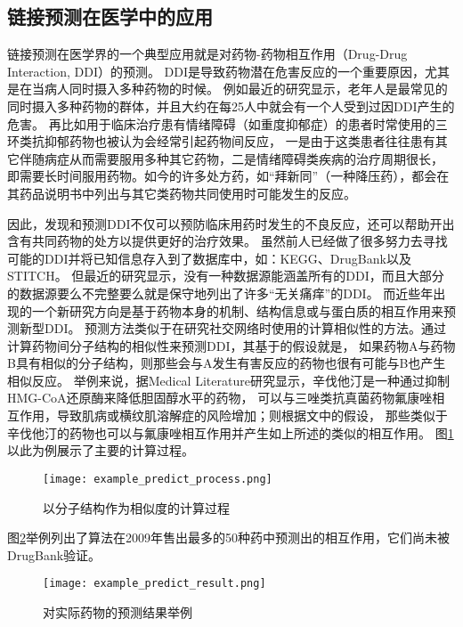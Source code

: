 \subsection{链接预测在医学中的应用}
链接预测在医学界的一个典型应用就是对药物-药物相互作用（Drug-Drug Interaction, DDI）的预测。
DDI是导致药物潜在危害反应的一个重要原因，尤其是在当病人同时摄入多种药物的时候\cite{fokoue2016predicting}。
例如最近的研究显示，老年人是最常见的同时摄入多种药物的群体，并且大约在每25人中就会有一个人受到过因DDI产生的危害\cite{huang2013systematic}\cite{juurlink2003drug}。
再比如用于临床治疗患有情绪障碍（如重度抑郁症）的患者时常使用的三环类抗抑郁药物也被认为会经常引起药物间反应，
一是由于这类患者往往患有其它伴随病症从而需要服用多种其它药物，二是情绪障碍类疾病的治疗周期很长，
即需要长时间服用药物。如今的许多处方药，如“拜新同”（一种降压药），都会在其药品说明书中列出与其它类药物共同使用时可能发生的反应。

因此，发现和预测DDI不仅可以预防临床用药时发生的不良反应，还可以帮助开出含有共同药物的处方以提供更好的治疗效果\cite{zhang2018prioritizing}。
虽然前人已经做了很多努力去寻找可能的DDI并将已知信息存入到了数据库中，如：KEGG、DrugBank以及STITCH。
但最近的研究显示，没有一种数据源能涵盖所有的DDI，而且大部分的数据源要么不完整要么就是保守地列出了许多“无关痛痒”的DDI\cite{fokoue2016predicting}。
而近些年出现的一个新研究方向是基于药物本身的机制、结构信息或与蛋白质的相互作用来预测新型DDI。
预测方法类似于在研究社交网络时使用的计算相似性的方法。\cite{vilar2012drug}通过计算药物间分子结构的相似性来预测DDI，其基于的假设就是，
如果药物A与药物B具有相似的分子结构，则那些会与A发生有害反应的药物也很有可能与B也产生相似反应。
举例来说，据Medical Literature研究显示，辛伐他汀是一种通过抑制HMG-CoA还原酶来降低胆固醇水平的药物，
可以与三唑类抗真菌药物氟康唑相互作用，导致肌病或横纹肌溶解症的风险增加；则根据文中的假设，
那些类似于辛伐他汀的药物也可以与氟康唑相互作用并产生如上所述的类似的相互作用。
图\ref{intro:fig:process}以此为例展示了主要的计算过程。
\begin{figure} 
  \centering
  \texttt{[image: example\_predict\_process.png]}
  \caption{以分子结构作为相似度的计算过程\cite{vilar2012drug}}
  \label{intro:fig:process}
\end{figure} 
图\ref{intro:fig:result}举例列出了算法在2009年售出最多的50种药中预测出的相互作用，它们尚未被DrugBank验证。
\begin{figure} 
  \centering
  \texttt{[image: example\_predict\_result.png]}
  \caption{对实际药物的预测结果举例\cite{vilar2012drug}}
  \label{intro:fig:result}
\end{figure} 

